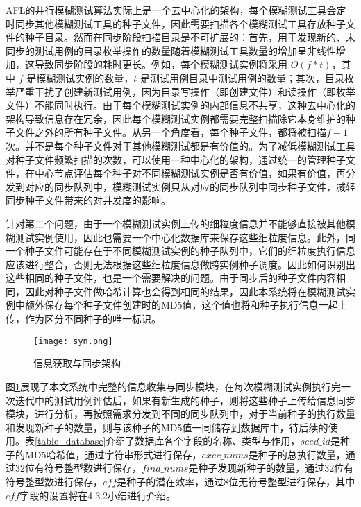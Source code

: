\documentclass[master]{thesis-uestc}
\begin{document}
AFL的并行模糊测试算法实际上是一个去中心化的架构，每个模糊测试工具会定时同步其他模糊测试工具的种子文件，因此需要扫描各个模糊测试工具存放种子文件的种子目录。然而在同步阶段扫描目录是不可扩展的：首先，用于发现新的、未同步的测试用例的目录枚举操作的数量随着模糊测试工具数量的增加呈非线性增加，这导致同步阶段的耗时更长。例如，每个模糊测试实例将采用 $O(f*t)$，其中 $f$ 是模糊测试实例的数量，$t$ 是测试用例目录中测试用例的数量；其次，目录枚举严重干扰了创建新测试用例，因为目录写操作（即创建文件）和读操作（即枚举文件）不能同时执行。由于每个模糊测试实例的内部信息不共享，这种去中心化的架构导致信息存在冗余，因此每个模糊测试实例都需要完整扫描除它本身维护的种子文件之外的所有种子文件。从另一个角度看，每个种子文件，都将被扫描$f-1$次。并不是每个种子文件对于其他模糊测试都是有价值的。为了减低模糊测试工具对种子文件频繁扫描的次数，可以使用一种中心化的架构，通过统一的管理种子文件，在中心节点评估每个种子对不同模糊测试实例是否有价值，如果有价值，再分发到对应的同步队列中，模糊测试实例只从对应的同步队列中同步种子文件，减轻同步种子文件带来的对并发度的影响。

针对第二个问题，由于一个模糊测试实例上传的细粒度信息并不能够直接被其他模糊测试实例使用，因此也需要一个中心化数据库来保存这些细粒度信息。此外，同一个种子文件可能存在于不同模糊测试实例的种子队列中，它们的细粒度执行信息应该进行整合，否则无法根据这些细粒度信息做跨实例种子调度。因此如何识别出这些相同的种子文件，也是一个需要解决的问题。由于同步后的种子文件内容相同，因此对种子文件做哈希计算也会得到相同的结果，因此本系统将在模糊测试实例中额外保存每个种子文件创建时的MD5值，这个值也将和种子执行信息一起上传，作为区分不同种子的唯一标识。

\begin{figure}[!htbp]
    \vspace{6pt}
    \centering
    \texttt{[image: syn.png]}
    \caption{信息获取与同步架构}
    \label{syn}
\end{figure}

图\ref{syn}展现了本文系统中完整的信息收集与同步模块，在每次模糊测试实例执行完一次迭代中的测试用例评估后，如果有新生成的种子，则将这些种子上传给信息同步模块，进行分析，再按照需求分发到不同的同步队列中，对于当前种子的执行数量和发现新种子的数量，则与该种子的MD5值一同储存到数据库中，待后续的使用。表\ref{table_database}介绍了数据库各个字段的名称、类型与作用，$seed\_id$是种子的MD5哈希值，通过字符串形式进行保存，$exec\_nums$是种子的总执行数量，通过32位有符号整型数进行保存，$find\_nums$是种子发现新种子的数量，通过32位有符号整型数进行保存，$eff$是种子的潜在效率，通过8位无符号整型进行保存，其中$eff$字段的设置将在4.3.2小结进行介绍。
\end{document}
